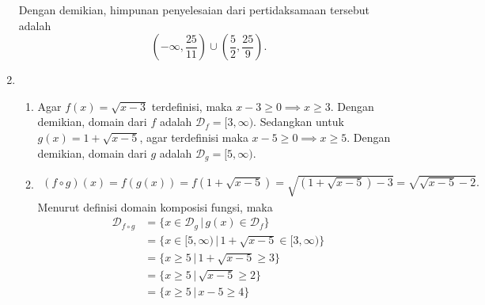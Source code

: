 \documentclass[11pt,openany,a4paper]{article}
\begin{document}
\begin{enumerate}
\begin{itemize}
\begin{center}
                    \end{center}
          \end{itemize}
          Dengan demikian, himpunan penyelesaian dari pertidaksamaan tersebut adalah
          \[
              \left(-\infty,\frac{25}{11}\right) \cup \left(\frac{5}{2},\frac{25}{9}\right).
          \]

    \item \begin{enumerate}
              \item Agar $f(x) = \sqrt{x - 3}$ terdefinisi, maka $x - 3 \geq 0 \implies x \geq 3$. Dengan demikian, domain dari $f$ adalah $\mathcal{D}_f = [3,\infty)$. Sedangkan untuk $g(x) = 1 + \sqrt{x - 5}$, agar terdefinisi maka $x - 5 \geq 0 \implies x \geq 5$. Dengan demikian, domain dari $g$ adalah $\mathcal{D}_g = [5,\infty)$.
              \item \begin{align*}
                        (f \circ g)(x)  = f(g(x))
                        = f(1 + \sqrt{x - 5})
                        = \sqrt{(1 + \sqrt{x - 5}) - 3}
                        = \sqrt{\sqrt{x - 5} - 2}.
                    \end{align*}
                    Menurut definisi domain komposisi fungsi, maka
                    \begin{align*}
                        \mathcal{D}_{f \circ g} & = \{x \in \mathcal{D}_g \,|\, g(x) \in \mathcal{D}_f\}       \\
                                                & = \{x \in [5,\infty) \,|\, 1 + \sqrt{x - 5} \in [3,\infty)\} \\
                                                & = \{x \geq 5 \,|\, 1 + \sqrt{x - 5} \geq 3\}                 \\
                                                & = \{x \geq 5 \,|\, \sqrt{x - 5} \geq 2\}                     \\
                                                & = \{x \geq 5 \,|\, x - 5 \geq 4\}                            \\

\end{align*}
\end{enumerate}
\end{enumerate}
\end{document}
